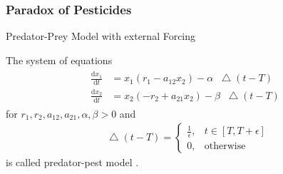 \documentclass[10pt, dvipsnames]{beamer}
\newcommand*\laplace{\mathop{}\!\mathbin\bigtriangleup}
\begin{document}
\subsubsection{Paradox of Pesticides}
\begin{frame}{Predator-Prey Model with external Forcing}

\begin{definition}
    The system of equations
    \begin{align}\label{eq: 2d_pesticide_model}
    \begin{split}
        \frac{\mathrm{d}x_1}{\mathrm{d}t} &= x_1 (r_1 - a_{12}x_2) - \alpha \laplace{(t-T)} \\
        \frac{\mathrm{d}x_2}{\mathrm{d}t} &= x_2 (-r_2 + a_{21}x_2) - \beta \laplace{(t-T)}
    \end{split}
    \end{align}
    for $r_1, r_2, a_{12}, a_{21}, \alpha, \beta > 0$ and
    \begin{align*}
     \laplace{(t-T)} = \left\{\begin{array}{ll} \frac{1}{\epsilon}, & t\in [T, T + \epsilon] \\
         0, & \mathrm{otherwise}\end{array}\right.
    \end{align*}
    is called predator-pest model \cite[2 \psqq]{pesticide_paradox}.
\end{definition}

\end{frame}
\end{document}
